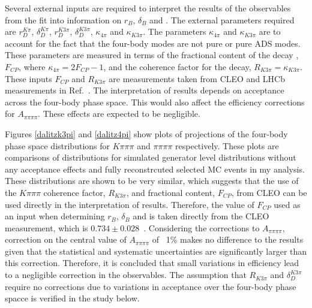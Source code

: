 Several external inputs are required to interpret the results of the \CP observables from the \CP fit into information on $r_B$, $\delta_B$ and \Pgamma. The external parameters required are $r_D^{K\pi}$, $\delta_D^{K\pi}$, $r_D^{K3\pi}$, $\delta_D^{K3\pi}$, $\kappa_{4\pi}$ and $\kappa_{K3\pi}$. The parameters $\kappa_{4\pi}$ and $\kappa_{K3\pi}$ are to account for the fact that the four-body modes are not pure \CP or pure ADS modes. These parameters are measured in terms of the fractional \CP content of the decay \decay{\Dz}{\pip\pim\pip\pim}, $F_{CP}$, where $\kappa_{4\pi} = 2F_{CP} - 1$, and the coherence factor for the \decay{\Dz}{\Km\pip\pim\pip} decay, $R_{K3\pi} = \kappa_{K3\pi}$. These inputs $F_{CP}$ and $R_{K3\pi}$ are measurements taken from CLEO and LHCb measurements in Ref.~\cite{charmk3pi,LHCb-PAPER-2015-057,charm4pi}. The interpretation of \lhcb results depends on \lhcb acceptance across the four-body phase space. This would also affect the efficiency corrections for $A_{\pi\pi\pi\pi}$. These effects are expected to be negligible.

Figures \ref{dalitzk3pi} and \ref{dalitz4pi} show plots of projections of the four-body phase space distributions for $K\pi\pi\pi$ and $\pi\pi\pi\pi$ respectively. These plots are comparisons of distributions for simulated generator level distributions without any acceptance effects and fully reconstrcuted selected MC events in my analysis. These distributions are shown to be very similar, which suggests that the use of the $K\pi\pi\pi$ coherence factor, $R_{K3\pi}$, and fractional \CP content, $F_{CP}$, from CLEO can be used directly in the interpretation of \lhcb results. Therefore, the value of $F_{CP}$ used as an input when determining $r_B$, $\delta_B$ and \Pgamma is taken directly from the CLEO measurement, which is $0.734 \pm 0.028$~\cite{charm4pi}. Considering the corrections to $A_{\pi\pi\pi\pi}$, correction on the central value of $A_{\pi\pi\pi\pi}$ of ~1\% makes no difference to the results given that the statistical and systematic uncertainties are significantly larger than this correction. Therefore, it is concluded that small variations in efficiency lead to a negligible correction in the observables. The assumption that $R_{K3\pi}$ and $\delta_D^{K3\pi}$ require no corrections due to variations in acceptance over the four-body phase spacce is verified in the study below.

